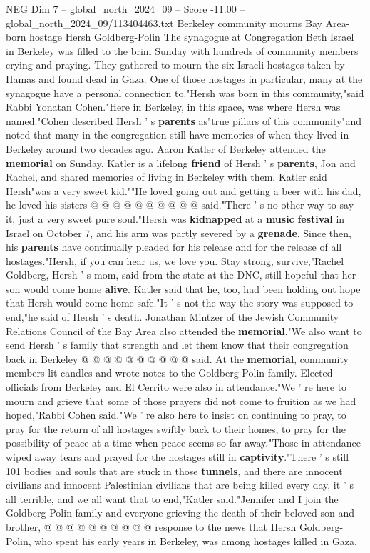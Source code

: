 \begin{textsample}{NEG Dim 7 – global\_north\_2024\_09 – Score -11.00 – global\_north\_2024\_09/113404463.txt}  \label{ex:f7_neg_012}
Berkeley community mourns Bay Area-born hostage Hersh Goldberg-Polin The synagogue at Congregation Beth Israel in Berkeley was filled to the brim Sunday with hundreds of community members crying and praying.
They gathered to mourn the six Israeli hostages taken by Hamas and found dead in Gaza.
One of those hostages in particular, many at the synagogue have a personal connection to."Hersh was born in this community,"said Rabbi Yonatan Cohen."Here in Berkeley, in this space, was where Hersh was named."Cohen described Hersh ' s \textbf{parents} as"true pillars of this community"and noted that many in the congregation still have memories of when they lived in Berkeley around two decades ago.
Aaron Katler of Berkeley attended the \textbf{memorial} on Sunday.
Katler is a lifelong \textbf{friend} of Hersh ' s \textbf{parents}, Jon and Rachel, and shared memories of living in Berkeley with them.
Katler said Hersh"was a very sweet kid.""He loved going out and getting a beer with his dad, he loved his sisters @ @ @ @ @ @ @ @ @ @ said."There ' s no other way to say it, just a very sweet pure soul."Hersh was \textbf{kidnapped} at a \textbf{music} \textbf{festival} in Israel on October 7, and his arm was partly severed by a \textbf{grenade}.
Since then, his \textbf{parents} have continually pleaded for his release and for the release of all hostages."Hersh, if you can hear us, we love you.
Stay strong, survive,"Rachel Goldberg, Hersh ' s mom, said from the state at the DNC, still hopeful that her son would come home \textbf{alive}.
Katler said that he, too, had been holding out hope that Hersh would come home safe."It ' s not the way the story was supposed to end,"he said of Hersh ' s death.
Jonathan Mintzer of the Jewish Community Relations Council of the Bay Area also attended the \textbf{memorial}."We also want to send Hersh ' s family that strength and let them know that their congregation back in Berkeley @ @ @ @ @ @ @ @ @ @ said.
At the \textbf{memorial}, community members lit candles and wrote notes to the Goldberg-Polin family.
Elected officials from Berkeley and El Cerrito were also in attendance."We ' re here to mourn and grieve that some of those prayers did not come to fruition as we had hoped,"Rabbi Cohen said."We ' re also here to insist on continuing to pray, to pray for the return of all hostages swiftly back to their homes, to pray for the possibility of peace at a time when peace seems so far away."Those in attendance wiped away tears and prayed for the hostages still in \textbf{captivity}."There ' s still 101 bodies and souls that are stuck in those \textbf{tunnels}, and there are innocent civilians and innocent Palestinian civilians that are being killed every day, it ' s all terrible, and we all want that to end,"Katler said."Jennifer and I join the Goldberg-Polin family and everyone grieving the death of their beloved son and brother, @ @ @ @ @ @ @ @ @ @ response to the news that Hersh Goldberg-Polin, who spent his early years in Berkeley, was among hostages killed in Gaza.

\end{textsample}
